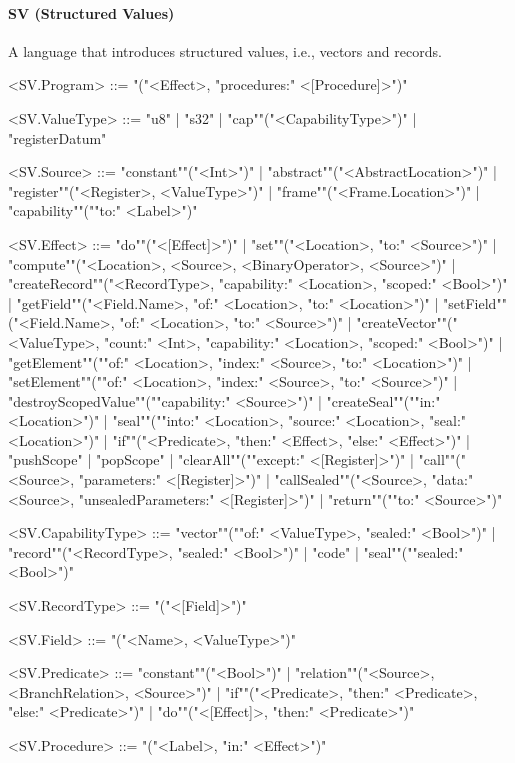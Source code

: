\documentclass[main.tex]{subfiles}
\begin{document}
\paragraph{ SV (Structured Values) } A language that introduces structured values, i.e., vectors and records.
\begin{grammar}
	\footnotesize
				<SV.Program> ::=
							"("<Effect>, "procedures:" <[Procedure]>")"
				\par
				<SV.ValueType> ::=
						"u8"
						| "s32"
						| "cap""("<CapabilityType>")"
						| "registerDatum"
				\par
				<SV.Source> ::=
						"constant""("<Int>")"
						| "abstract""("<AbstractLocation>")"
						| "register""("<Register>, <ValueType>")"
						| "frame""("<Frame.Location>")"
						| "capability""(""to:" <Label>")"
				\par
				<SV.Effect> ::=
						"do""("<[Effect]>")"
						| "set""("<Location>, "to:" <Source>")"
						| "compute""("<Location>, <Source>, <BinaryOperator>, <Source>")"
						| "createRecord""("<RecordType>, "capability:" <Location>, "scoped:" <Bool>")"
						| "getField""("<Field.Name>, "of:" <Location>, "to:" <Location>")"
						| "setField""("<Field.Name>, "of:" <Location>, "to:" <Source>")"
						| "createVector""("<ValueType>, "count:" <Int>, "capability:" <Location>, "scoped:" <Bool>")"
						| "getElement""(""of:" <Location>, "index:" <Source>, "to:" <Location>")"
						| "setElement""(""of:" <Location>, "index:" <Source>, "to:" <Source>")"
						| "destroyScopedValue""(""capability:" <Source>")"
						| "createSeal""(""in:" <Location>")"
						| "seal""(""into:" <Location>, "source:" <Location>, "seal:" <Location>")"
						| "if""("<Predicate>, "then:" <Effect>, "else:" <Effect>")"
						| "pushScope"
						| "popScope"
						| "clearAll""(""except:" <[Register]>")"
						| "call""("<Source>, "parameters:" <[Register]>")"
						| "callSealed""("<Source>, "data:" <Source>, "unsealedParameters:" <[Register]>")"
						| "return""(""to:" <Source>")"
				\par
				<SV.CapabilityType> ::=
						"vector""(""of:" <ValueType>, "sealed:" <Bool>")"
						| "record""("<RecordType>, "sealed:" <Bool>")"
						| "code"
						| "seal""(""sealed:" <Bool>")"
				\par
				<SV.RecordType> ::=
							"("<[Field]>")"
				\par
				<SV.Field> ::=
							"("<Name>, <ValueType>")"
				\par
				<SV.Predicate> ::=
						"constant""("<Bool>")"
						| "relation""("<Source>, <BranchRelation>, <Source>")"
						| "if""("<Predicate>, "then:" <Predicate>, "else:" <Predicate>")"
						| "do""("<[Effect]>, "then:" <Predicate>")"
				\par
				<SV.Procedure> ::=
							"("<Label>, "in:" <Effect>")"
				\par
\end{grammar}
\par
\end{document}
